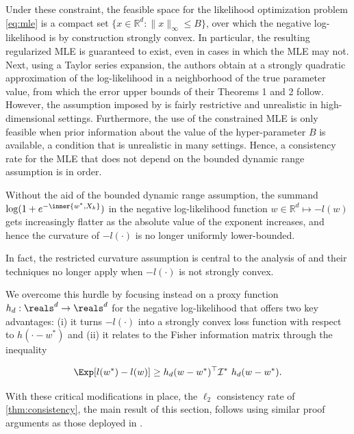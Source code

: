 Under these constraint, the feasible space for the likelihood optimization problem \ref{eq:mle} is a compact set $\{ x \in \mathbb{R}^d \colon \| x\|_\infty \leq B\}$, over which the negative log-likelihood is by construction strongly convex. In particular, the resulting  regularized MLE is guaranteed to exist, even in cases in which the MLE may not. Next, using a Taylor series expansion, the authors obtain at a strongly quadratic approximation of the log-likelihood in a neighborhood of the true parameter value, from which the error upper bounds of their Theorems 1 and 2 follow. However, the assumption imposed by \citet{shah2016estimation} is fairly restrictive and unrealistic in high-dimensional settings. Furthermore, the use of the constrained MLE is only feasible when prior information about the value of the hyper-parameter $B$ is available, a condition that is unrealistic in many settings. Hence, a consistency rate for the  MLE  that does not depend on the bounded dynamic range assumption is in order. 

Without the aid of the bounded dynamic range assumption, the summand $\log(1+e^{- \inner{w^*, X_k}})$ in the negative log-likelihood function $w \in \mathbb{R}^d \mapsto -l(w)$ gets increasingly flatter as the absolute value of the exponent increases, and hence the curvature of $-l(\cdot)$ is no longer uniformly lower-bounded.

In fact, the restricted curvature assumption is central to the analysis of \citet{shah2016estimation} and their techniques no longer apply when $-l(\cdot)$ is not strongly convex.

We overcome this hurdle by focusing instead on a proxy function $h_d : \reals^d \rightarrow \reals^d$ for the negative log-likelihood that offers two key advantages: (i) it turns $-l(\cdot)$ into a strongly convex loss function with respect to $h(\cdot - w^*)$ and (ii) it relates to the Fisher information matrix through the inequality

\begin{equation}
    \Exp[l(w^*) - l(w)] \geq h_d(w - w^*)^\top \mathcal{I}^* ~ h_d(w - w^*).
\end{equation}

With these critical modifications in place, the $\ell_2$ consistency rate of \ref{thm:consistency}, the main result of this section, follows using similar proof arguments as those deployed in \citet{shah2016estimation}. 

